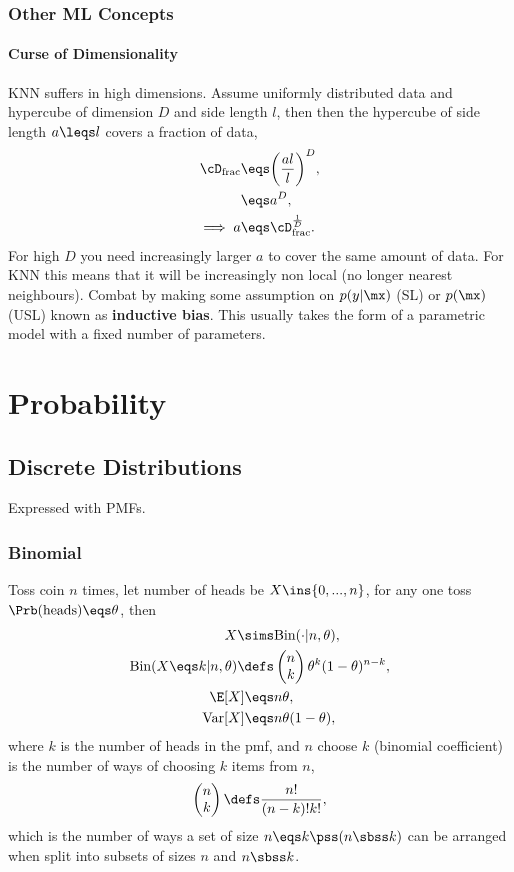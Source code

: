 \documentclass[11pt,a4paper]{report}
\begin{document}
\subsection{Other ML Concepts}
\subsubsection{Curse of Dimensionality}
KNN suffers in high dimensions. Assume uniformly distributed data and hypercube of dimension $D$ and side length $l$, then
then the hypercube of side length $a\leqs l$ covers a fraction of data,
\begin{align}
	\cD_{\text{frac}}&\eqs \bigg(\frac{al}{l}\bigg)^{D},\\
	&\eqs a^{D},\\
	\implies a&\eqs \cD_{\text{frac}}^{\frac{1}{D}}.
\end{align}
For high $D$ you need increasingly larger $a$ to cover the same amount of data. For KNN this means that it will be increasingly non local (no longer nearest neighbours). Combat by making some assumption on $p(y|\mx)$ (SL) or $p(\mx)$ (USL) known as {\bf inductive bias}. This usually takes the form of a parametric model with a fixed number of parameters.


\chapter{Probability}
\section{Discrete Distributions}
Expressed with PMFs.

\subsection{Binomial}
Toss coin $n$ times, let number of heads be $X\ins\{0,...,n\}$, for any one toss $\Prb(\text{heads})\eqs\theta$, then
\begin{align*}
	X\sims&\text{Bin}(\cdot|n,\theta),\\
	\text{Bin}(X\eqs k|n,\theta)\defs&\begin{pmatrix} n\\k \end{pmatrix} \theta^{k}(1-\theta)^{n-k},\\
	\E[X]\eqs&n\theta,\\
	\text{Var}[X]\eqs&n\theta(1-\theta),
\end{align*}
where $k$ is the number of heads in the pmf, and $n$ choose $k$ (binomial coefficient) is the number of ways of choosing $k$ items from $n$,
\begin{align*}
	\begin{pmatrix} n\\k \end{pmatrix} \defs \frac{n!}{(n-k)!k!},
\end{align*}
which is the number of ways a set of size $n\eqs k\pss (n\sbss k)$ can be arranged when split into subsets of sizes $n$ and $n\sbss k$.
\end{document}
